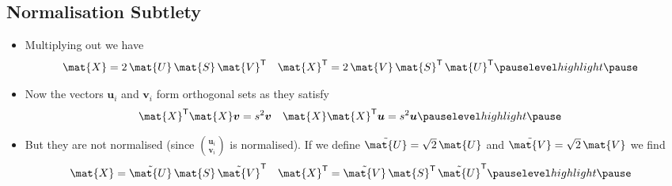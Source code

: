\begin{slide}
  \section[-1.5]{Normalisation Subtlety}

  \pb \pause{}
  \begin{center}
    \pause
  \end{center}
    \vspace*{-5mm}
  \squeeze
  \begin{itemize}
  \item Multiplying out we have
    \vspace*{-5mm}
    \begin{align*}
      \mat{X} &= 2\, \mat{U}\,\mat{S}\,\mat{V}^\tr &
             \mat{X}^\tr &=2\,  \mat{V}\,\mat{S}^\tr\,\mat{U}^\tr\pauseh
    \end{align*}
    \vspace*{-15mm}
    
  \item Now the vectors $\bm{u}_i$ and $\bm{v}_i$ form orthogonal
    sets as they satisfy
    \vspace*{-5mm}
  \begin{align*}
    \mat{X}^\tr \mat{X} \bm{v} &= s^2 \bm{v} &
    \mat{X} \mat{X}^\tr \bm{u} &= s^2 \bm{u}\pauseh
  \end{align*}
  \vspace*{-15mm}
  
\item But they are not normalised (since $\binom{\bm{u}_i}{\bm{v}_i}$
  is normalised). If we define     $\tilde{\mat{U}} =
  \sqrt{2}\,\mat{U}$ and $\tilde{\mat{V}} = \sqrt{2}\,\mat{V}$
  we find
    \vspace*{-5mm}
  \begin{align*}
    \mat{X}   &=      \tilde{\mat{U}} \,\mat{S}\, \tilde{\mat{V}}^\tr &
    \mat{X}^\tr &= \tilde{\mat{V}} \,\mat{S}^\tr\, \tilde{\mat{U}}^\tr\pauseh
  \end{align*}
\end{itemize}

\end{slide}




